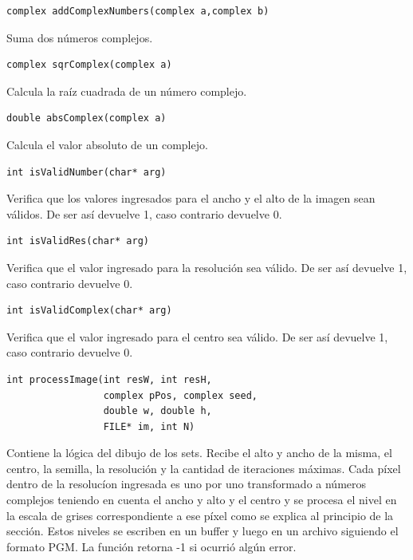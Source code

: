\documentclass[a4paper,10pt]{article}
\begin{document}
\begin{lstlisting}[frame=single]
complex addComplexNumbers(complex a,complex b)
\end{lstlisting}
Suma dos n\'{u}meros complejos.
\newline

\begin{lstlisting}[frame=single]
complex sqrComplex(complex a)
\end{lstlisting}
Calcula la ra\'{i}z cuadrada de un n\'{u}mero complejo.
\newline

\begin{lstlisting}[frame=single]
double absComplex(complex a)
\end{lstlisting}
Calcula el valor absoluto de un complejo.
\newline


\begin{lstlisting}[frame=single]
int isValidNumber(char* arg)
\end{lstlisting}
Verifica que los valores ingresados para el ancho y el alto de la imagen sean v\'{a}lidos.
De ser as\'{i} devuelve 1, caso contrario devuelve 0.
\newline

\begin{lstlisting}[frame=single]
int isValidRes(char* arg) 
\end{lstlisting}
Verifica que el valor ingresado para la resoluci\'{o}n sea v\'{a}lido.
De ser as\'{i} devuelve 1, caso contrario devuelve 0.
\newline

\begin{lstlisting}[frame=single]
int isValidComplex(char* arg)
\end{lstlisting}
Verifica que el valor ingresado para el centro sea v\'{a}lido.
De ser as\'{i} devuelve 1, caso contrario devuelve 0.
\newline


\begin{lstlisting}[frame=single]
int processImage(int resW, int resH,
                 complex pPos, complex seed,
                 double w, double h,
                 FILE* im, int N)
\end{lstlisting}
Contiene la l\'{o}gica del dibujo de los sets. Recibe el alto y ancho de la misma, el centro, la semilla, la resoluci\'{o}n y la cantidad de iteraciones m\'{a}ximas.
Cada p\'{i}xel dentro de la resoluc\'{i}on ingresada es uno por uno transformado a n\'{u}meros complejos teniendo en cuenta el ancho y alto y el centro y se procesa el nivel en la escala de grises correspondiente a ese p\'{i}xel como se explica al principio de la secci\'{o}n.
Estos niveles se escriben en un buffer y luego en un archivo siguiendo el formato PGM.
La funci\'{o}n retorna -1 si ocurri\'{o} alg\'{u}n error.
\newline
\end{document}
